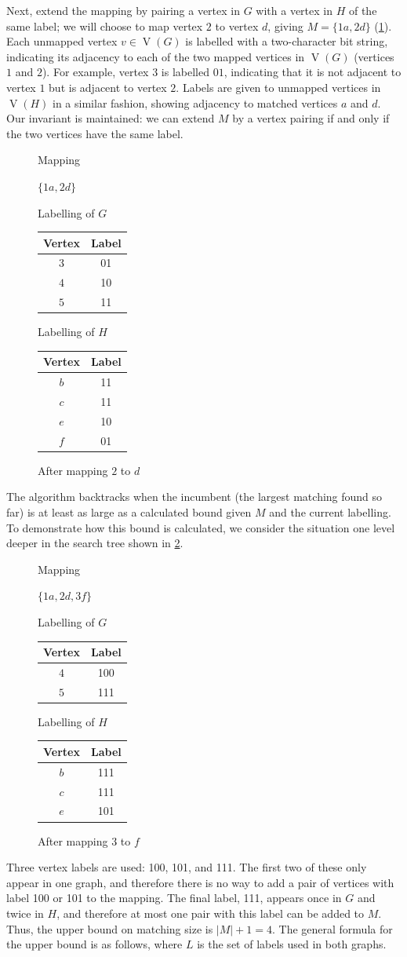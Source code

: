 \documentclass[letterpaper]{article}
\DeclareMathOperator{\V}{V}
\newcommand{\LabelTables}[4] {
  \centering
  \begin{minipage}[t]{#1\linewidth}
      Mapping

      \bigskip

      #2
  \end{minipage}
  \quad
  \begin{minipage}[t]{0.3\linewidth}
      \centering Labelling of $G$
      \begin{tabular}[t]{cc}
      \hline
          Vertex & Label\\
      \hline
          #3
      \hline
      \end{tabular}
  \end{minipage}
  \quad
  \begin{minipage}[t]{0.3\linewidth}
      \centering Labelling of $H$
      \begin{tabular}[t]{cc}
      \hline
          Vertex & Label\\
      \hline
          #4
      \hline
      \end{tabular}
  \end{minipage}
}
\begin{document}
Next, extend the mapping by pairing a vertex in $G$ with a vertex in $H$ of the
same label; we will choose to map vertex $2$ to vertex $d$, giving $M=\{1a,
2d\}$ (\cref{fig:alg3}).  Each unmapped vertex $v \in \V(G)$ is labelled
with a two-character bit string, indicating its adjacency to each of
the two mapped vertices in $\V(G)$ (vertices $1$ and $2$).  For example, vertex
$3$ is labelled $01$, indicating that it is not adjacent to vertex $1$ but is adjacent
to vertex $2$.  Labels are given to unmapped vertices in $\V(H)$ in a similar fashion,
showing adjacency to matched vertices $a$ and $d$.  Our invariant is
maintained: we can extend $M$ by a vertex pairing if and only if the two
vertices have the same label.

\begin{figure}[ht]
  \LabelTables{.15}
              {$\{1a,2d\}$}
              {$3$ & 01 \\
               $4$ & 10 \\
               $5$ & 11 \\}
              {$b$ & 11 \\
               $c$ & 11 \\
               $e$ & 10 \\
               $f$ & 01 \\}
\caption{After mapping $2$ to $d$}
\label{fig:alg3}
\end{figure}

The algorithm backtracks when the incumbent (the largest matching found so far) is at least as large
as a calculated bound given $M$ and the current labelling. To demonstrate how
this bound is calculated, we consider the situation one level deeper in the
search tree shown in \cref{fig:alg4}.

\begin{figure}[ht]
  \LabelTables{.2}
              {$\{1a,2d,3f\}$}
              {$4$ & 100 \\
               $5$ & 111 \\}
              {$b$ & 111 \\
               $c$ & 111 \\
               $e$ & 101 \\}
\caption{After mapping $3$ to $f$}
\label{fig:alg4}
\end{figure}

Three vertex labels are used: 100,
101, and 111.  The first two of these only appear in one graph, and therefore
there is no way to add a pair of vertices with label 100 or 101 to the mapping.
The final label, 111, appears once in $G$ and twice in $H$, and therefore at
most one pair with this label can be added to $M$.  Thus, the upper bound on
matching size is $|M| + 1 = 4$. The general formula for the upper bound is
as follows, where $L$ is the set of labels used in both graphs.
\end{document}
